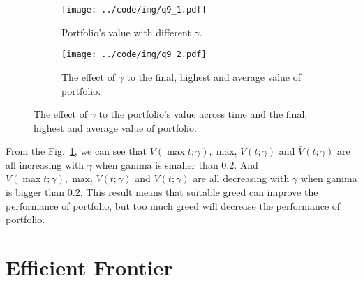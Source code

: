 \documentclass[runningheads]{llncs}
\begin{document}
\begin{figure}[!htbp]
    \begin{subfigure}[t]{0.49\textwidth}
        \centering
        \texttt{[image: ../code/img/q9\_1.pdf]}
        \caption{Portfolio's value with different $\gamma$.}
    \end{subfigure}
    \begin{subfigure}[t]{0.49\textwidth}
        \centering
        \texttt{[image: ../code/img/q9\_2.pdf]}
        \caption{The effect of $\gamma$ to the final, highest and average value of portfolio.}
    \end{subfigure}
    \caption{ The effect of $\gamma$ to the portfolio's value across time and the final, highest and average value of portfolio.}
    \label{fig:q9}
\end{figure}

From the Fig.~\ref{fig:q9}, we can see that $V(\max{t};\gamma), \max_t{V(t;\gamma)}$ and $\bar{V}(t;\gamma)$ are all increasing with $\gamma$ when gamma is smaller than $0.2$.
And $V(\max{t};\gamma), \max_t{V(t;\gamma)}$ and $\bar{V}(t;\gamma)$ are all decreasing with $\gamma$ when gamma is bigger than $0.2$.
This result means that suitable greed can improve the performance of portfolio, but too much greed will decrease the performance of portfolio.


\section{Efficient Frontier}\label{sec:10}

\end{document}

